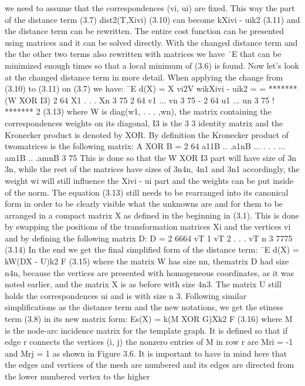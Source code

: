 \documentclass[../structure.tex]{subfiles}
\begin{document}
we need to assume that the correspondences (vi, ui) are fixed. This
way the part of the distance term (3.7)
dist2(T,Xivi) (3.10)
can become
kXivi - uik2 (3.11)
and the distance term can be rewritten. The entire cost function can be
presented using matrices and it can be solved directly. With the changed
distance term and the the other two terms also rewritten with matrices we
have
¯E
that can be minimized enough times so that a local minimum of (3.6) is
found.
Now let’s look at the changed distance term in more detail. When applying
the change from (3.10) to (3.11) on (3.7) we have:
¯E
d(X) =
X
vi2V
wikXivi - uik2 =
=
*******
(W XOR I3)
2
64
X1
. . .
Xn
3
75 2 64
v1
...
vn
3
75
-
2
64
u1
...
un
3
75
!
*******
2
(3.13)
where W is diag(w1, . . . ,wn), the matrix containing the correspondences
weights on its diagonal, I3 is the 3  3 identity matrix and the Kronecker
product is denoted by XOR. By definition the Kronecker product of twomatrices
is the following matrix:
A XOR B =
2
64
a11B .. .a1nB
...
. . .
...
am1B .. .amnB
3
75
This is done so that the W XOR I3 part will have size of 3n  3n, while the
rest of the matrices have sizes of 3n4n, 4n1 and 3n1 accordingly, the
weight wi will still influence the Xivi - ui part and the weights can be put
inside of the norm.
The equation (3.13) still needs to be rearranged into its canonical form
in order to be clearly visible what the unknowns are and for them to be
arranged in a compact matrix X as defined in the beginning in (3.1). This
is done by swapping the positions of the transformation matrices Xi and the
vertices vi and by defining the following matrix D:
D =
2
6664
vT
1
vT
2
. . .
vT
n
3
7775
(3.14)
In the end we get the final simplified form of the distance term:
¯E
d(X) = kW(DX - U)k2
F (3.15)
where the matrix W has size nn, thematrix D had size n4n, because the
vertices are presented with homogeneous coordinates, as it was noted earlier,
and the matrix X is as before with size 4n3. The matrix U still holds the
correspondences ui and is with size n  3.
Following similar simplifications as the distance term and the new notations,
we get the stiness term (3.8) in its new matrix form:
Es(X) = k(M XOR G)Xk2
F (3.16)
where M is the node-arc incidence matrix for the template graph. It is
defined so that if edge r connects the vertices (i, j) the nonzero entries of M
in row r are Mri = -1 and Mrj = 1 as shown in Figure 3.6. It is important
to have in mind here that the edges and vertices of the mesh are numbered
and its edges are directed from the lower numbered vertex to the higher
\end{document}
